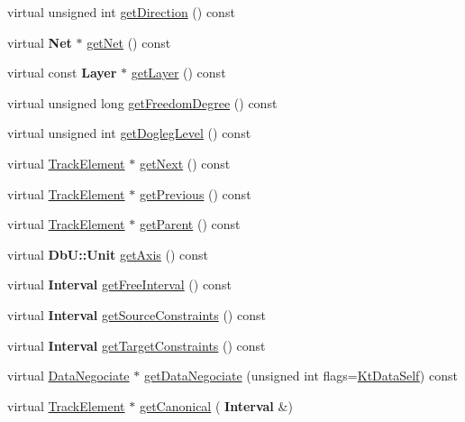 \begin{DoxyCompactItemize}
\item 
virtual unsigned int \hyperlink{classKite_1_1TrackSegment_a0dd7cf705ace42c662c289955313b2e9}{get\+Direction} () const
\item 
virtual \textbf{ Net} $\ast$ \hyperlink{classKite_1_1TrackSegment_a692492374623a5c6096b2c4a51190359}{get\+Net} () const
\item 
virtual const \textbf{ Layer} $\ast$ \hyperlink{classKite_1_1TrackSegment_ab045567c4f529dca7790d66c17c3084f}{get\+Layer} () const
\item 
virtual unsigned long \hyperlink{classKite_1_1TrackSegment_aa7552c20cc46abcac558627b2ca341f8}{get\+Freedom\+Degree} () const
\item 
virtual unsigned int \hyperlink{classKite_1_1TrackSegment_add78c6f914788c549f144998caacda84}{get\+Dogleg\+Level} () const
\item 
virtual \hyperlink{classKite_1_1TrackElement}{Track\+Element} $\ast$ \hyperlink{classKite_1_1TrackSegment_a010b7fc8801c5b88aefa4137cf85186d}{get\+Next} () const
\item 
virtual \hyperlink{classKite_1_1TrackElement}{Track\+Element} $\ast$ \hyperlink{classKite_1_1TrackSegment_a55d6115d84c11ad147f4c38fe372ea24}{get\+Previous} () const
\item 
virtual \hyperlink{classKite_1_1TrackElement}{Track\+Element} $\ast$ \hyperlink{classKite_1_1TrackSegment_a95ec3b8e7e1ec87c20ee0b37bcc96df7}{get\+Parent} () const
\item 
virtual \textbf{ Db\+U\+::\+Unit} \hyperlink{classKite_1_1TrackSegment_ab5b5aaa5b318369feee6003dbad039c2}{get\+Axis} () const
\item 
virtual \textbf{ Interval} \hyperlink{classKite_1_1TrackSegment_a034711e2d3617ea848ef9f5a18255e10}{get\+Free\+Interval} () const
\item 
virtual \textbf{ Interval} \hyperlink{classKite_1_1TrackSegment_a48f8b54f9489da3778d85c382a483f81}{get\+Source\+Constraints} () const
\item 
virtual \textbf{ Interval} \hyperlink{classKite_1_1TrackSegment_a69af7d4287bc0e44c9ca2c8e6f692be9}{get\+Target\+Constraints} () const
\item 
virtual \hyperlink{classKite_1_1DataNegociate}{Data\+Negociate} $\ast$ \hyperlink{classKite_1_1TrackSegment_acd0170a05128ec4af16ecd0060c3a3b5}{get\+Data\+Negociate} (unsigned int flags=\hyperlink{namespaceKite_acca8fffa3182dea5f94208f454f14b47a68e917ff37d4b5cef906303181836404}{Kt\+Data\+Self}) const
\item 
virtual \hyperlink{classKite_1_1TrackElement}{Track\+Element} $\ast$ \hyperlink{classKite_1_1TrackSegment_af2d46d64cbd02bdbba53d5483d95e26d}{get\+Canonical} (\textbf{ Interval} \&)

\end{DoxyCompactItemize}
